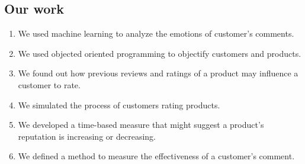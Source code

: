 \documentclass[12pt]{article}  %
\begin{document}
\subsection{Our work}
\begin{enumerate}[\bfseries 1.]
    \item We used machine learning to analyze the emotions of customer's comments.
    \item We used objected oriented programming to objectify customers and products.
      \item We found out how previous reviews and ratings of a product may influence a customer to rate.
    \item We simulated the process of customers rating products.
    \item We developed a time-based measure that might suggest a product's reputation is increasing or decreasing.
      \item We defined a method to measure the effectiveness of a customer's comment.
\end{enumerate}
\end{document}
